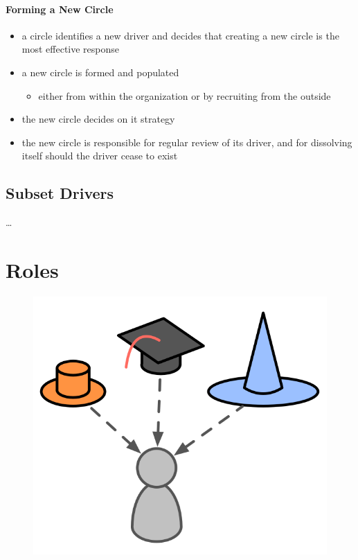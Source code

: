 \subsubsection{Forming a New Circle}
\label{forminganewcircle}

\begin{itemize}
\item a circle identifies a new driver and decides that creating a new circle is the most effective response

\item a new circle is formed and populated

\begin{itemize}
\item either from within the organization or by recruiting from the outside

\end{itemize}

\item the new circle decides on it strategy

\item the new circle is responsible for regular review of its driver, and for dissolving itself should the driver cease to exist

\end{itemize}

\section{Subset Drivers}
\label{subsetdrivers}

{\ldots}

\chapter{Roles}
\label{roles}

\begin{figure}[htbp]
\centering
\includegraphics[keepaspectratio,width=\textwidth,height=0.75\textheight]{img/people-and-roles/roles.png}
\end{figure}

